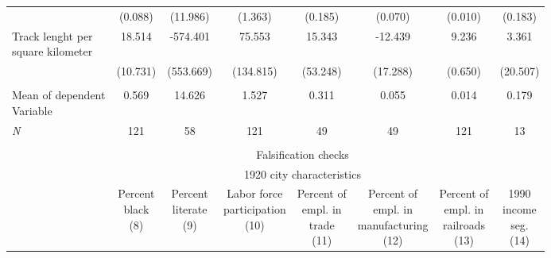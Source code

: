 \begin{table}[H]
{\begin{threeparttable}
\begin{tabular}{lccccccc}
            &     (0.088)         &    (11.986)         &     (1.363)         &     (0.185)         &     (0.070)         &     (0.010)         &     (0.183)         \\
\makecell{Track lenght per \\ square kilometer}&      18.514         &    -574.401         &      75.553         &      15.343         &     -12.439         &       9.236\sym{***}&       3.361         \\
            &    (10.731)         &   (553.669)         &   (134.815)         &    (53.248)         &    (17.288)         &     (0.650)         &    (20.507)         \\
\smallskip \\
\makecell{Mean of dependent \\ Variable}&       0.569         &      14.626         &       1.527         &       0.311         &       0.055         &       0.014         &       0.179         \\
\textit{N}  &         121         &          58         &         121         &          49         &          49         &         121         &          13         \\
\smallskip \\
 & \multicolumn{6}{c}{Falsification checks} \\ \cmidrule{2-8} & \multicolumn{6}{c}{1920 city characteristics} \\   \cmidrule(lr){2-7}  & \makecell{Percent \\ black \\  (8)} & \makecell{Percent \\ literate \\ (9)} & \makecell{Labor force \\ participation \\ (10)} & \makecell{Percent of \\ empl. in \\ trade \\ (11)} & \makecell{Percent of \\ empl. in \\ manufacturing \\ (12)} & \makecell{Percent of \\ empl. in \\ railroads \\ (13)} & \makecell{1990 \\ income \\ seg. \\ (14) }  \\ \midrule 

\end{tabular}
\end{threeparttable}}
\end{table}

